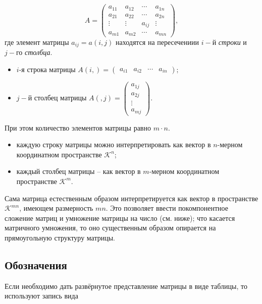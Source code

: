 \documentclass[a4paper, 12pt]{article} %
\begin{document}
\begin{equation}
    {\textstyle A={\begin{pmatrix}a_{11}&a_{12}&\cdots &a_{1n}\\a_{21}&a_{22}&\cdots &a_{2n}\\\vdots &\vdots &a_{ij}&\vdots \\a_{m1}&a_{m2}&\cdots &a_{mn}\end{pmatrix}},}
\end{equation}
где элемент матрицы $a_{ij} = a(i, j)$ находятся на пересечениии $i-$й \textit{строки} и $j-$го \textit{столбца}.

\begin{itemize}
    \item $i$-я строка матрицы $A(i,)={\begin{pmatrix}a_{{i1}}&a_{{i2}}&\cdots &a_{{in}}\end{pmatrix}};$
    \item $j-$й столбец матрицы $A(,j)={\begin{pmatrix}a_{1j}\\a_{2j}\\\vdots \\a_{mj}\end{pmatrix}}.$
\end{itemize}

При этом количество элементов матрицы равно $m \cdot n.$
\begin{itemize}
    \item каждую строку матрицы можно интерпретировать как вектор в $n$-мерном координатном пространстве $\mathcal{K}^{n}$;
    \item каждый столбец матрицы -- как вектор в $m$-мерном координатном пространстве $\mathcal{K}^{m}$.
\end{itemize}

Сама матрица естественным образом интерпретируется как вектор в пространстве $\mathcal{K}^{mn}$, имеющем размерность $mn$. Это позволяет ввести покомпонентное сложение матриц и умножение матрицы на число (см. ниже); что касается матричного умножения, то оно существенным образом опирается на прямоугольную структуру матрицы.

\subsection*{Обозначения}
Если необходимо дать развёрнутое представление матрицы в виде таблицы, то используют запись вида
\end{document}
